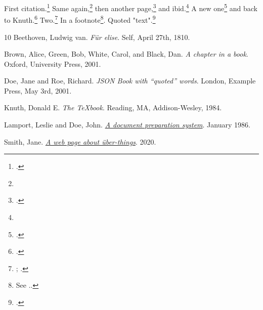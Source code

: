 First citation.\footnote{.} Same again,\footnote{}
then another page,\footnote{.} and ibid.\footnote{}
A new one\footnote{.} and back to Knuth.\footnote{.}
Two.\footnote{; .} In a footnote\footnote{See
..}. Quoted "text".\footnote{.}

\begin{cslbibliography}{1}{0}
Beethoven, Ludwig van. \textit{Für elise}. Self, April 27th, 1810.

Brown, Alice, Green, Bob, White, Carol, and Black, Dan. \textit{A chapter in a book}. Oxford, University Press, 2001.

Doe, Jane and Roe, Richard. \textit{JSON Book with “quoted” words}. London, Example Press, May 3rd, 2001.

Knuth, Donald E. \textit{The TeXbook}. Reading, MA, Addison-Wesley, 1984.

Lamport, Leslie and Doe, John. \textit{\href{https://doi.org/10.1000/xyz123}{A document preparation system}}. January 1986.

Smith, Jane. \textit{\href{https://example.com/page}{A web page about über-things}}. 2020.

\end{cslbibliography}
